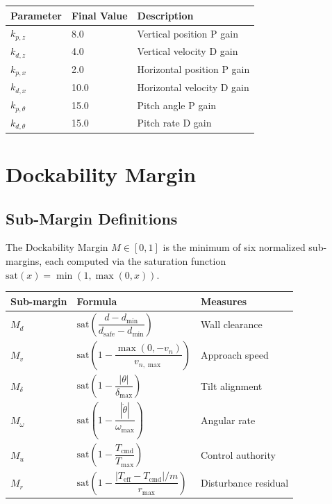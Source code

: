 \documentclass[12pt]{article}
\begin{document}
\begin{center}
\begin{tabular}{lll}
\toprule
\textbf{Parameter} & \textbf{Final Value} & \textbf{Description} \\
\midrule
$k_{p,z}$ & 8.0  & Vertical position P gain \\
$k_{d,z}$ & 4.0  & Vertical velocity D gain \\
$k_{p,x}$ & 2.0  & Horizontal position P gain \\
$k_{d,x}$ & 10.0 & Horizontal velocity D gain \\
$k_{p,\theta}$ & 15.0 & Pitch angle P gain \\
$k_{d,\theta}$ & 15.0 & Pitch rate D gain \\
\bottomrule
\end{tabular}
\end{center}

\section{Dockability Margin}

\subsection{Sub-Margin Definitions}

The Dockability Margin $M \in [0,1]$ is the minimum of six normalized
sub-margins, each computed via the saturation function
$\mathrm{sat}(x) = \min(1, \max(0, x))$.

\begin{center}
\begin{tabular}{lll}
\toprule
\textbf{Sub-margin} & \textbf{Formula} & \textbf{Measures} \\
\midrule
$M_d$ & $\mathrm{sat}\!\left(\dfrac{d - d_{\min}}{d_\mathrm{safe} - d_{\min}}\right)$ & Wall clearance \\[8pt]
$M_v$ & $\mathrm{sat}\!\left(1 - \dfrac{\max(0,-v_n)}{v_{n,\max}}\right)$ & Approach speed \\[8pt]
$M_\delta$ & $\mathrm{sat}\!\left(1 - \dfrac{|\theta|}{\delta_{\max}}\right)$ & Tilt alignment \\[8pt]
$M_\omega$ & $\mathrm{sat}\!\left(1 - \dfrac{|\dot{\theta}|}{\omega_{\max}}\right)$ & Angular rate \\[8pt]
$M_u$ & $\mathrm{sat}\!\left(1 - \dfrac{T_\mathrm{cmd}}{T_{\max}}\right)$ & Control authority \\[8pt]
$M_r$ & $\mathrm{sat}\!\left(1 - \dfrac{|T_\mathrm{eff} - T_\mathrm{cmd}|/m}{r_{\max}}\right)$ & Disturbance residual \\
\bottomrule
\end{tabular}
\end{center}
\end{document}

